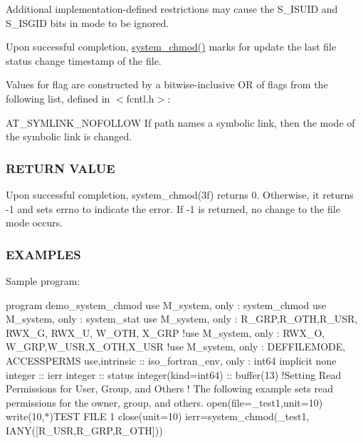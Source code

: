 Additional implementation-\/defined restrictions may cause the S\+\_\+\+I\+S\+U\+ID and S\+\_\+\+I\+S\+G\+ID bits in mode to be ignored.

Upon successful completion, \mbox{\hyperlink{namespacem__system_ace9ce0c8a9c8341a76b8903cd2390ce3}{system\+\_\+chmod()}} marks for update the last file status change timestamp of the file.

Values for flag are constructed by a bitwise-\/inclusive OR of flags from the following list, defined in $<$fcntl.\+h$>$\+:

A\+T\+\_\+\+S\+Y\+M\+L\+I\+N\+K\+\_\+\+N\+O\+F\+O\+L\+L\+OW If path names a symbolic link, then the mode of the symbolic link is changed.

\subsubsection*{R\+E\+T\+U\+RN V\+A\+L\+UE}

Upon successful completion, system\+\_\+chmod(3f) returns 0. Otherwise, it returns -\/1 and sets errno to indicate the error. If -\/1 is returned, no change to the file mode occurs.

\subsubsection*{E\+X\+A\+M\+P\+L\+ES}

Sample program\+:

program demo\+\_\+system\+\_\+chmod use M\+\_\+system, only \+: system\+\_\+chmod use M\+\_\+system, only \+: system\+\_\+stat use M\+\_\+system, only \+: R\+\_\+\+G\+RP,R\+\_\+\+O\+TH,R\+\_\+\+U\+SR, R\+W\+X\+\_\+G, R\+W\+X\+\_\+U, W\+\_\+\+O\+TH, X\+\_\+\+G\+RP !use M\+\_\+system, only \+: R\+W\+X\+\_\+O, W\+\_\+\+G\+RP,W\+\_\+\+U\+SR,X\+\_\+\+O\+TH,X\+\_\+\+U\+SR !use M\+\_\+system, only \+: D\+E\+F\+F\+I\+L\+E\+M\+O\+DE, A\+C\+C\+E\+S\+S\+P\+E\+R\+MS use,intrinsic \+:\+: iso\+\_\+fortran\+\_\+env, only \+: int64 implicit none integer \+:\+: ierr integer \+:\+: status integer(kind=int64) \+:\+: buffer(13) !\+Setting Read Permissions for User, Group, and Others ! The following example sets read permissions for the owner, group, and others. open(file=\textquotesingle{}\+\_\+test1\textquotesingle{},unit=10) write(10,$\ast$)\textquotesingle{}T\+E\+ST F\+I\+LE 1\textquotesingle{} close(unit=10) ierr=system\+\_\+chmod(\textquotesingle{}\+\_\+test1\textquotesingle{}, I\+A\+N\+Y(\mbox{[}\+R\+\_\+\+U\+S\+R,\+R\+\_\+\+G\+R\+P,\+R\+\_\+\+O\+T\+H\mbox{]}))

